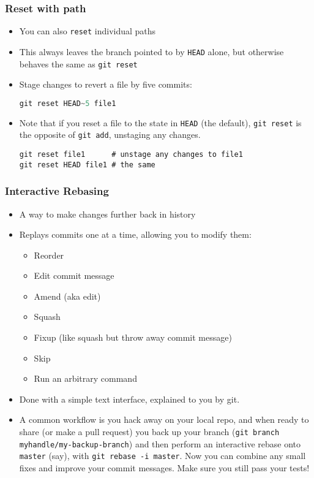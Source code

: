 \begin{frame}[fragile]
\frametitle{Reset with path}
\begin{itemize}
\item You can also \lstinline{reset} individual paths
\item This always leaves the branch pointed to by \texttt{HEAD} alone, but otherwise behaves the same as \lstinline{git reset}
\item Stage changes to revert a file by five commits:
\begin{lstlisting}[language=C++]
git reset HEAD~5 file1
\end{lstlisting}
\item Note that if you reset a file to the state in \texttt{HEAD} (the default), \lstinline{git reset} is the opposite of \lstinline{git add}, unstaging any changes.
\begin{lstlisting}
git reset file1      # unstage any changes to file1
git reset HEAD file1 # the same
\end{lstlisting}
\end{itemize}
\end{frame}

\begin{frame}[fragile]
\frametitle{Interactive Rebasing}
\begin{itemize}
\item A way to make changes further back in history
\item Replays commits one at a time, allowing you to modify them:
\begin{itemize}
\item Reorder
\item Edit commit message
\item Amend (aka edit)
\item Squash
\item Fixup (like squash but throw away commit message)
\item Skip
\item Run an arbitrary command
\end{itemize}
\item Done with a simple text interface, explained to you by git.
\item A common workflow is you hack away on your local repo, and when ready to share (or make a pull request) you back up your branch (\lstinline{git branch myhandle/my-backup-branch}) and then perform an interactive rebase onto \lstinline{master} (say), with \lstinline{git rebase -i master}. Now you can combine any small fixes and improve your commit messages. Make sure you still pass your tests!
\end{itemize}
\end{frame}

